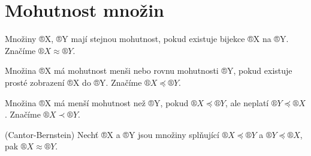 \documentclass[12pt]{article}					%
\begin{document}
\section{Mohutnost množin}
    \begin{definice}
        Množiny ®X, ®Y mají stejnou mohutnost, pokud existuje bijekce ®X na ®Y. Značíme $®X ≈ ®Y$.

        Množina ®X má mohutnost menši nebo rovnu mohutnosti ®Y, pokud existuje prosté zobrazení ®X do ®Y. Značíme $®X \preceq ®Y$.

        Množina ®X má menší mohutnost než ®Y, pokud $®X \preceq ®Y$, ale neplatí $®Y \preceq ®X$. Značíme $®X \prec ®Y$.
    \end{definice}

    \begin{veta}(Cantor-Bernstein)
        Nechť ®X a ®Y jsou množiny splňující $®X \preceq ®Y$ a $®Y \preceq ®X$, pak $®X ≈ ®Y$.
    \end{veta}
\end{document}
